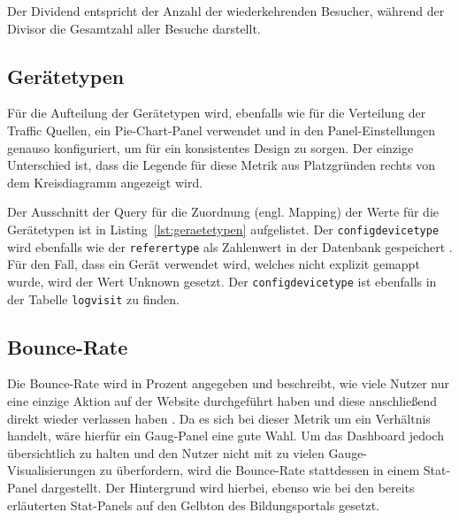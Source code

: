 Der Dividend entspricht der Anzahl der wiederkehrenden Besucher, während der Divisor die Gesamtzahl aller Besuche darstellt.

\subsection{Gerätetypen}
Für die Aufteilung der Gerätetypen wird, ebenfalls wie für die \glqq Verteilung der Traffic Quellen\grqq{}, ein Pie-Chart-Panel verwendet und in den Panel-Einstellungen genauso konfiguriert, um für ein konsistentes Design zu sorgen. Der einzige Unterschied ist, dass die Legende für diese Metrik aus Platzgründen rechts von dem Kreisdiagramm angezeigt wird.

\begin{figure}[H]
    \centering
    \begin{minipage}{\textwidth}
        
    \end{minipage}
\end{figure}

Der Ausschnitt der Query für die Zuordnung (engl. Mapping) der Werte für die Gerätetypen ist in Listing~\ref{lst:geraetetypen} aufgelistet. Der \texttt{config\textunderscore device\textunderscore type} wird ebenfalls wie der \texttt{referer\textunderscore type} als Zahlenwert in der Datenbank gespeichert \parencite{GithubDevices}. Für den Fall, dass ein Gerät verwendet wird, welches nicht explizit gemappt wurde, wird der Wert \glqq Unknown\grqq{} gesetzt. Der \texttt{config\textunderscore device\textunderscore type} ist ebenfalls in der Tabelle \texttt{log\textunderscore visit} zu finden. 

\subsection{Bounce-Rate}
Die \glqq Bounce-Rate\grqq{} wird in Prozent angegeben und beschreibt, wie viele Nutzer nur eine einzige Aktion auf der Website durchgeführt haben und diese anschließend direkt wieder verlassen haben \parencite[S.33]{Dykes2014}. Da es sich bei dieser Metrik um ein Verhältnis handelt, wäre hierfür ein Gaug-Panel eine gute Wahl. Um das Dashboard jedoch übersichtlich zu halten und den Nutzer nicht mit zu vielen Gauge-Visualisierungen zu überfordern, wird die Bounce-Rate stattdessen in einem Stat-Panel dargestellt. Der Hintergrund wird hierbei, ebenso wie bei den bereits erläuterten Stat-Panels auf den Gelbton des Bildungsportals gesetzt.

